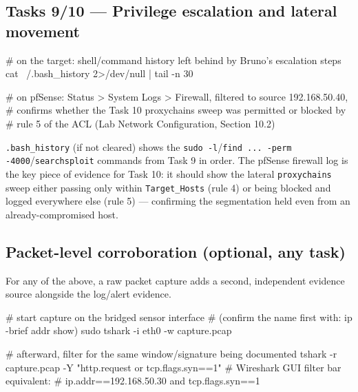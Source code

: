 \documentclass[11pt,a4paper]{article}
\begin{document}
\subsection{Tasks 9/10 --- Privilege escalation and lateral movement}
\begin{cmdbox}
\begin{cmdverb}
# on the target: shell/command history left behind by Bruno's escalation steps
cat ~/.bash_history 2>/dev/null | tail -n 30

# on pfSense: Status > System Logs > Firewall, filtered to source 192.168.50.40,
# confirms whether the Task 10 proxychains sweep was permitted or blocked by
# rule 5 of the ACL (Lab Network Configuration, Section 10.2)
\end{cmdverb}
\end{cmdbox}

\begin{expectbox}
\texttt{.bash\_history} (if not cleared) shows the \texttt{sudo -l}/\texttt{find ...
-perm -4000}/\texttt{searchsploit} commands from Task 9 in order. The pfSense firewall
log is the key piece of evidence for Task 10: it should show the lateral
\texttt{proxychains} sweep either passing only within \texttt{Target\_Hosts} (rule 4)
or being blocked and logged everywhere else (rule 5) --- confirming the segmentation
held even from an already-compromised host.
\end{expectbox}

\subsection{Packet-level corroboration (optional, any task)}
For any of the above, a raw packet capture adds a second, independent evidence source
alongside the log/alert evidence.

\begin{cmdbox}
\begin{cmdverb}
# start capture on the bridged sensor interface
# (confirm the name first with: ip -brief addr show)
sudo tshark -i eth0 -w capture.pcap

# afterward, filter for the same window/signature being documented
tshark -r capture.pcap -Y "http.request or tcp.flags.syn==1"
# Wireshark GUI filter bar equivalent:
# ip.addr==192.168.50.30 and tcp.flags.syn==1
\end{cmdverb}
\end{cmdbox}
\end{document}
